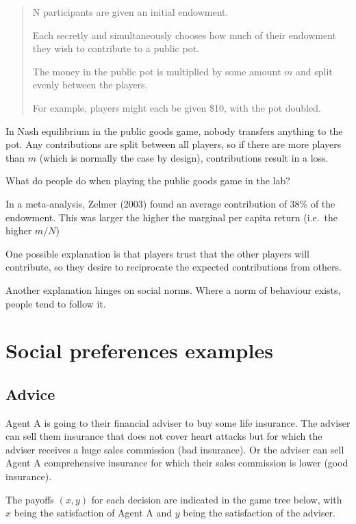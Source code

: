 \documentclass[
  letterpaper,
  DIV=11,
  numbers=noendperiod]{scrreprt}
\begin{document}
\begin{quote}
N participants are given an initial endowment.

Each secretly and simultaneously chooses how much of their endowment
they wish to contribute to a public pot.

The money in the public pot is multiplied by some amount \(m\) and split
evenly between the players.

For example, players might each be given \$10, with the pot doubled.
\end{quote}

In Nash equilibrium in the public goods game, nobody transfers anything
to the pot. Any contributions are split between all players, so if there
are more players than \(m\) (which is normally the case by design),
contributions result in a loss.

What do people do when playing the public goods game in the lab?

In a meta-analysis, Zelmer (2003) found an average contribution of 38\%
of the endowment. This was larger the higher the marginal per capita
return (i.e.~the higher \(m/N\))

One possible explanation is that players trust that the other players
will contribute, so they desire to reciprocate the expected
contributions from others.

Another explanation hinges on social norms. Where a norm of behaviour
exists, people tend to follow it.

\hypertarget{social-preferences-examples}{%
\chapter{Social preferences
examples}\label{social-preferences-examples}}

\hypertarget{advice}{%
\section{Advice}\label{advice}}

Agent A is going to their financial adviser to buy some life insurance.
The adviser can sell them insurance that does not cover heart attacks
but for which the adviser receives a huge sales commission (bad
insurance). Or the adviser can sell Agent A comprehensive insurance for
which their sales commission is lower (good insurance).

The payoffs \((x,y)\) for each decision are indicated in the game tree
below, with \(x\) being the satisfaction of Agent A and \(y\) being the
satisfaction of the adviser.
\end{document}
